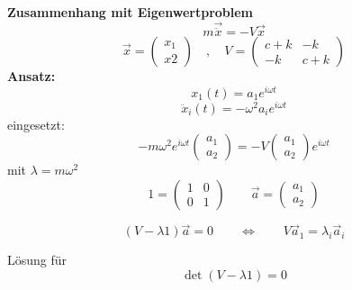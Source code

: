 \documentclass[titlepage,12pt,a4paper,ngerman]{report}
\newcommand{\frbox}[2]{\begin{tcolorbox}[colback=white,colframe=red!75!black,fonttitle=\bfseries,title=#1]#2\end{tcolorbox}} %
\begin{document}
\textbf{Zusammenhang mit Eigenwertproblem}
$$ m\vec{\ddot{x}} = - V \vec{x}$$
$$ \vec{x} = \begin{pmatrix}
x_1 \\
x2
\end{pmatrix} \quad , \quad V = \begin{pmatrix}
c+k & -k \\
-k & c+k
\end{pmatrix}$$
\textbf{Ansatz:}
$$ x_1(t) = a_1 e^{i\omega t}$$
$$ \ddot{x}_i (t) = - \omega^2 a_i e^{i \omega t}$$
eingesetzt:
$$ -m \omega^2 e ^{ i \omega t} \begin{pmatrix}
a_1\\
a_2
\end{pmatrix} = - V \begin{pmatrix}
a_1\\
a_2
\end{pmatrix} e ^{i \omega t}$$
mit $\lambda = m \omega^2$
$$ 1 = \begin{pmatrix}
1 & 0 \\
0 & 1
\end{pmatrix} \qquad \vec{a} = \begin{pmatrix}
a_1\\
a_2
\end{pmatrix}$$
\frbox{Eigenwertgleichung $ \qquad \qquad \qquad \quad \Leftrightarrow \qquad $ charakteristische Gleichung}{\begin{equation} (V- \lambda 1 ) \vec{a} = 0 \qquad \Leftrightarrow \qquad V \vec{a}_1 = \lambda_i \vec{a}_i \tag{1} \end{equation}}
\noindent Lösung für $$\det (V - \lambda 1 ) = 0$$

\end{document}
